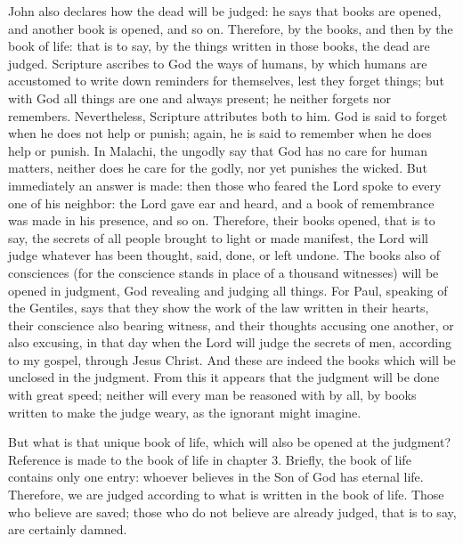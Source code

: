 John also declares how the dead will be judged: he says that books are opened, and another book is opened, and so on. Therefore, by the books, and then by the book of life: that is to say, by the things written in those books, the dead are judged. Scripture ascribes to God the ways of humans, by which humans are accustomed to write down reminders for themselves, lest they forget things; but with God all things are one and always present; he neither forgets nor remembers. Nevertheless, Scripture attributes both to him. God is said to forget when he does not help or punish; again, he is said to remember when he does help or punish. In Malachi, the ungodly say that God has no care for human matters, neither does he care for the godly, nor yet punishes the wicked. But immediately an answer is made: then those who feared the Lord spoke to every one of his neighbor: the Lord gave ear and heard, and a book of remembrance was made in his presence, and so on. Therefore, their books opened, that is to say, the secrets of all people brought to light or made manifest, the Lord will judge whatever has been thought, said, done, or left undone. The books also of consciences (for the conscience stands in place of a thousand witnesses) will be opened in judgment, God revealing and judging all things. For Paul, speaking of the Gentiles, says that they show the work of the law written in their hearts, their conscience also bearing witness, and their thoughts accusing one another, or also excusing, in that day when the Lord will judge the secrets of men, according to my gospel, through Jesus Christ. And these are indeed the books which will be unclosed in the judgment. From this it appears that the judgment will be done with great speed; neither will every man be reasoned with by all, by books written to make the judge weary, as the ignorant might imagine.

But what is that unique book of life, which will also be opened at the judgment? Reference is made to the book of life in chapter 3. Briefly, the book of life contains only one entry: whoever believes in the Son of God has eternal life. Therefore, we are judged according to what is written in the book of life. Those who believe are saved; those who do not believe are already judged, that is to say, are certainly damned.

